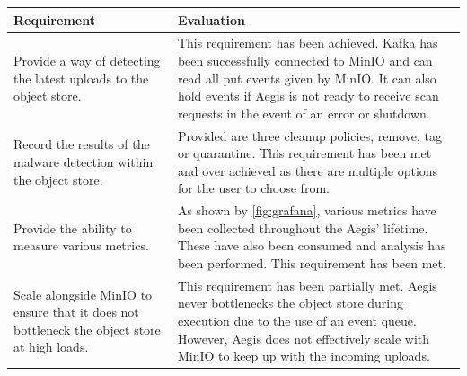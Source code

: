\documentclass[12pt, conference, final, a4paper, onecolumn, compsoc]{IEEEtran}
\begin{document}
\begin{table}[H]
  \centering
  \begin{tabular}{|p{}|p{}|}
    \hline
    \textbf{Requirement} & \textbf{Evaluation} \\ \hline
    Provide a way of detecting the latest uploads to the object store. & This
                                                                        requirement
    has been achieved. Kafka has been successfully connected to MinIO and can
                                                                        read all
    put events given by MinIO. It can also hold events if Aegis is not ready to
                                                                        receive
                                                                        scan
                                                                        requests
    in the event of an error or shutdown. \\ \hline
    Record the results of the malware detection within the object store. &
                                                                          Provided
                                                                          are
                                                                          three
                                                                          cleanup
    policies, remove, tag or quarantine. This requirement has been met and over
                                                                          achieved
    as there are multiple options for the user to choose from. \\ \hline
    Provide the ability to measure various metrics. & As shown by
                                                     \ref{fig:grafana}, various
                                                     metrics have been collected
    throughout the Aegis' lifetime. These have also been consumed and
                                                     analysis has been
                                                     performed. This requirement
    has been met. \\ \hline
    Scale alongside MinIO to ensure that it does not bottleneck the object store
    at high loads. & This requirement has been partially met. Aegis never
                    bottlenecks the object store during execution due to the use
    of an event queue. However, Aegis does not effectively scale with MinIO to
                    keep up with the incoming uploads. \\ \hline

\end{tabular}
\end{table}
\end{document}
